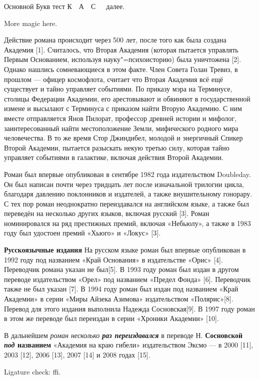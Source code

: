 \documentclass[a5paper,10pt]{extbook}
\begin{document}




Основной Букв тест К~~А~~С~~~далее.


More magic here.

Действие романа происходит через 500 лет, после того как была создана Академия [1]. Считалось, что Вторая Академия (которая пытается управлять Первым Основанием, используя науку"=психоисторию) была уничтожена [2]. Однако нашлись сомневающиеся в этом факте. Член Совета Голан Тревиз, в прошлом — офицер космофлота, считает что Вторая Академия всё ещё существует и тайно управляет событиями. По приказу мэра на Терминусе, столицы Федерации Академии, его арестовывают и обвиняют в государственной измене и высылают с Терминуса с приказом найти Вторую Академию. С ним вместе отправляется Янов Пилорат, профессор древней истории и мифолог, заинтересованный найти местоположение Земли, мифического родного мира человечества. В то же время Стор Джиндибел, молодой и энергичный Спикер Второй Академии, пытается разыскать некую третью силу, которая тайно управляет событиями в галактике, включая действия Второй Академии.

Роман был впервые опубликован в сентябре 1982 года издательством Doubleday. Он был написан почти через тридцать лет после изначальной трилогии цикла, благодаря давлению поклонников и издателей, а также внушительному гонорару. С тех пор роман неоднократно переиздавался на английском языке, а также был переведён на несколько других языков, включая русский [3].
Роман номинировался на ряд престижных премий, включая «Небьюлу», а также в 1983 году был удостоен премий «Хьюго» и «Локус» [3].

\textbf{Русскоязычные издания}
На русском языке роман был впервые опубликован в 1992 году под названием «Край Основания» в издательстве «Орис» [4]. Переводчик романа указан не был[5]. В 1993 году роман был издан в другом переводе издательством «Орел» под названием «Предел Фонда» [6]. Переводчик также не был указан [7].
В 1994 году роман был издан под названием «Край Академии» в серии «Миры Айзека Азимова» издательством «Полярис»[8]. Перевод для этого издания выполнила Надежда Сосновская[9]. В 1997 году роман в этом же переводе был переиздан в серии «Хроники Академии» [10].

В дальнейшем \textit{роман несколько \textbf{раз переиздавался}} в переводе Н. \textbf{Сосновской \textit{под} названием} «Академия на краю гибели» издательством Эксмо — в 2000 [11], 2003 [12], 2006 [13], 2007 [14] и 2008 годах [15].

Ligature check: ffi.
\end{document}
